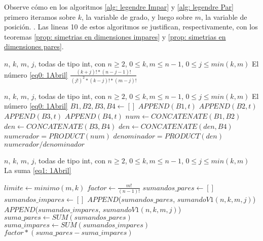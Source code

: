 Observe cómo
en los algoritmos \ref{alg: legendre Impar} y \ref{alg: legendre Par}
primero iteramos sobre $k$, la variable de grado, y
luego sobre $m$, la variable de posición. .
Las lineas 10 de estos 
algoritmos 
se justifican,
respectivamente, con los teoremas \ref{prop: simetrias en dimensiones impares}
y \ref{prop: simetrias en dimensiones pares}.

\begin{algorithm}
\caption{$sumandoV1$}\label{alg: sumandoV1}
\begin{algorithmic} [1]
\REQUIRE $n$, $k$, $m$, $j$, todas de tipo int, con $n \geq 2$, 
$0 \leq k, m \leq n-1$, $0 \leq j \leq min(k,m)$
\ENSURE El número \eqref{eq0: 1Abril}
\RETURN $\frac{(k+j)! * (n-j-1)! }{(j!)^{2}* (k-j)! * (m-j)!}$
\end{algorithmic}
\end{algorithm}

\begin{algorithm}
\caption{$sumandoV2$}\label{alg: sumandoV2}
\begin{algorithmic} [1]
\REQUIRE $n$, $k$, $m$, $j$, todas de tipo int, con $n \geq 2$, 
$0 \leq k, m \leq n-1$, $0 \leq j \leq min(k,m)$
\ENSURE El número \eqref{eq0: 1Abril}
\STATE $B1, B2, B3, B4 \leftarrow []$
\STATE $APPEND(B1, t)$
\ENDFOR
{} 
\STATE $APPEND(B2, t)$
\ENDFOR
{} 
\STATE $APPEND(B3, t)$
\ENDFOR
{} 
\STATE $APPEND(B4, t)$
\ENDFOR
\STATE $num \leftarrow CONCATENATE(B1, B2)$
\STATE $den \leftarrow CONCATENATE(B3, B4)$
\STATE $den \leftarrow CONCATENATE(den, B4)$
\STATE $numerador = PRODUCT(num)$
\STATE $denominador = PRODUCT(den)$
\RETURN $numerador/denominador$
\end{algorithmic}
\end{algorithm}



\begin{algorithm}
\caption{$sumatoriaV1$}\label{alg: sumatoriaV1}
\begin{algorithmic} [1]
\REQUIRE $n$, $k$, $m$, $j$, todas de tipo int, con $n \geq 2$, 
$0 \leq k, m \leq n-1$, $0 \leq j \leq min(k,m)$
\ENSURE La suma \eqref{eq1: 1Abril}

\STATE $limite \leftarrow minimo(m,k)$
\STATE $factor \leftarrow \frac{m!}{(n-1)!}$
\STATE $sumandos\_pares \leftarrow []$
\STATE $sumandos\_impares \leftarrow []$
\STATE $APPEND$($sumandos\_pares$, $sumandoV1(n,k,m,j)$)
\ENDFOR
{} 
\STATE $APPEND$($sumandos\_impares$, $sumandoV1(n,k,m,j)$)
\ENDFOR
\STATE $suma\_pares \leftarrow SUM(sumandos\_pares)$
\STATE $suma\_impares \leftarrow SUM(sumandos\_impares)$
\RETURN $factor * (suma\_pares - suma\_impares)$
\end{algorithmic}
\end{algorithm}


